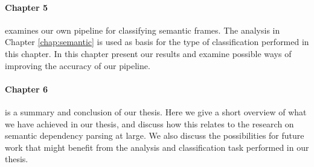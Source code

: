 \paragraph{Chapter 5} examines our own pipeline for classifying semantic frames. The analysis in Chapter \ref{chap:semantic} is used as basis for the type of classification performed in this chapter. In this chapter present our results and examine possible ways of improving the accuracy of our pipeline.

\paragraph{Chapter 6} is a summary and conclusion of our thesis. Here we give a short overview of what we have achieved in our thesis, and discuss how this relates to the research on semantic dependency parsing at large. We also discuss the possibilities for future work that might benefit from the analysis and classification task performed in our thesis.